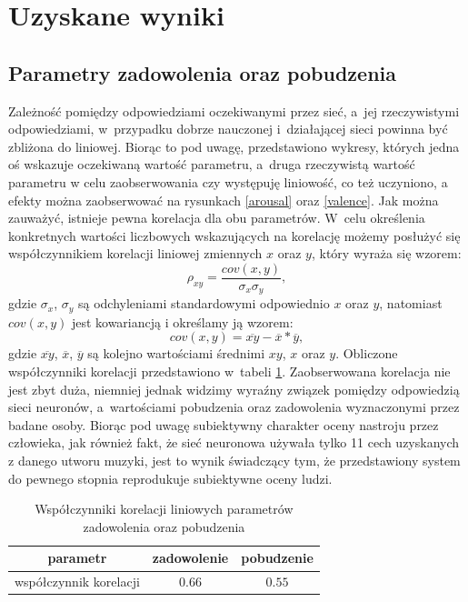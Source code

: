\section{Uzyskane wyniki}\label{rozdzial_wyniki}
\newcommand{\imageSize}{1.15}
\subsection{Parametry zadowolenia oraz pobudzenia}
Zależność pomiędzy odpowiedziami oczekiwanymi przez sieć, a~jej rzeczywistymi odpowiedziami, w~przypadku dobrze nauczonej i~działającej sieci powinna być zbliżona do liniowej. Biorąc to pod uwagę, przedstawiono wykresy, których jedna oś wskazuje oczekiwaną wartość parametru, a~druga rzeczywistą wartość parametru w celu zaobserwowania czy występuję liniowość, co też uczyniono, a efekty można zaobserwować na rysunkach \ref{arousal} oraz \ref{valence}. Jak można zauważyć, istnieje pewna korelacja dla obu parametrów. W~celu określenia konkretnych wartości liczbowych wskazujących na korelację możemy posłużyć się współczynnikiem korelacji liniowej zmiennych $x$ oraz $y$, który wyraża się wzorem:
\begin{equation}
\rho_{xy} = \frac{cov(x,y)}{\sigma_x \sigma_y},
\end{equation}
gdzie $\sigma_x$, $\sigma_y$ są odchyleniami standardowymi odpowiednio $x$ oraz $y$, natomiast $cov(x,y)$ jest kowariancją i określamy ją wzorem:
\begin{equation}
cov(x,y) = \overline{xy} - \overline{x}*\overline{y},
\end{equation}
gdzie $\overline{xy}$, $\overline{x}$, $\overline{y}$ są kolejno wartościami średnimi $xy$, $x$ oraz $y$.
Obliczone współczynniki korelacji przedstawiono w~tabeli \ref{table:coeff}.
Zaobserwowana korelacja nie jest zbyt duża, niemniej jednak widzimy wyraźny związek pomiędzy odpowiedzią sieci neuronów, a~wartościami pobudzenia oraz zadowolenia wyznaczonymi przez badane osoby. Biorąc pod uwagę subiektywny
charakter oceny nastroju przez człowieka, jak również fakt, że sieć neuronowa używała tylko 11 cech uzyskanych z danego utworu muzyki, jest to wynik świadczący tym, że przedstawiony system do pewnego stopnia reprodukuje subiektywne oceny ludzi.
\begin{table}
\centering
\begin{tabular}{|c|c|c|}
\hline
 parametr & zadowolenie & pobudzenie \\ 
\hline
 współczynnik korelacji & $0.66$ & $0.55$ \\  
\hline 
\end{tabular}
\caption{Współczynniki korelacji liniowych parametrów zadowolenia oraz pobudzenia} \label{table:coeff}
\end{table}


